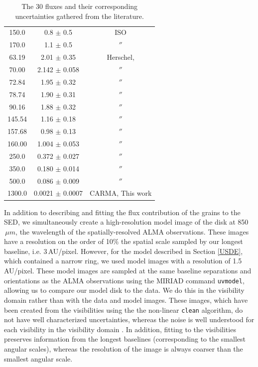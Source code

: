 \begin{table}
\begin{center}
\begin{tabular}{ccc}
    150.0 & 0.8 $\pm$ 0.5 & ISO \\  
    170.0 & 1.1 $\pm$ 0.5 & $''$ \\  
    63.19 & 2.01 $\pm$ 0.35 & Herschel, \cite{Robe13} \\
    70.00 & 2.142 $\pm$ 0.058 & $''$ \\
    72.84 & 1.95 $\pm$ 0.32 & $''$ \\
    78.74 & 1.90 $\pm$ 0.31 & $''$ \\
    90.16 & 1.88 $\pm$ 0.32 & $''$ \\
    145.54 & 1.16 $\pm$ 0.18 & $''$ \\
    157.68 & 0.98 $\pm$ 0.13 & $''$ \\
    160.00 & 1.004 $\pm$ 0.053 & $''$ \\
    250.0 & 0.372 $\pm$ 0.027 & $''$ \\
    350.0 & 0.180 $\pm$ 0.014 & $''$ \\
    500.0 & 0.086 $\pm$ 0.009 & $''$ \\
    1300.0 & 0.0021 $\pm$ 0.0007 & CARMA, This work \\
        \hline
\end{tabular}
    \end{center}
\label{tab:SED}
\caption{The 30 fluxes and their corresponding uncertainties gathered from the literature.}
\end{table}

In addition to describing and fitting the flux contribution of the grains to the SED, we simultaneously create a high-resolution model image of the disk at 850$\,\mu m$, the wavelength of the spatially-resolved ALMA observations. These images have a resolution on the order of 10$\%$ the spatial scale sampled by our longest baseline, i.e. 3\,AU/pixel. However, for the model described in Section \ref{USDE}, which contained a narrow ring, we used model images with a resolution of 1.5\,AU/pixel. These model images are sampled at the same baseline separations and orientations as the ALMA observations using the MIRIAD command \texttt{uvmodel}, allowing us to compare our model disk to the data. We do this in the visibility domain rather than with the data and model images. These images, which have been created from the visibilities using the the non-linear \texttt{clean} algorithm, do not have well characterized uncertainties, whereas the noise is well understood for each visibility in the visibility domain \citep{Schw78_clean}. In addition, fitting to the visibilities preserves information from the longest baselines (corresponding to the smallest angular scales), whereas the resolution of the image is always coarser than the smallest angular scale.
 
